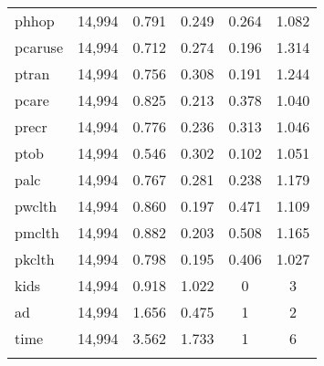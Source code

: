 \documentclass[]{article}
\begin{document}
\begin{table}[!htbp]
\begin{tabular}{@{\extracolsep{5pt}}lccccc}
phhop & 14,994 & 0.791 & 0.249 & 0.264 & 1.082 \\ 
pcaruse & 14,994 & 0.712 & 0.274 & 0.196 & 1.314 \\ 
ptran & 14,994 & 0.756 & 0.308 & 0.191 & 1.244 \\ 
pcare & 14,994 & 0.825 & 0.213 & 0.378 & 1.040 \\ 
precr & 14,994 & 0.776 & 0.236 & 0.313 & 1.046 \\ 
ptob & 14,994 & 0.546 & 0.302 & 0.102 & 1.051 \\ 
palc & 14,994 & 0.767 & 0.281 & 0.238 & 1.179 \\ 
pwclth & 14,994 & 0.860 & 0.197 & 0.471 & 1.109 \\ 
pmclth & 14,994 & 0.882 & 0.203 & 0.508 & 1.165 \\ 
pkclth & 14,994 & 0.798 & 0.195 & 0.406 & 1.027 \\ 
kids & 14,994 & 0.918 & 1.022 & 0 & 3 \\ 
ad & 14,994 & 1.656 & 0.475 & 1 & 2 \\ 
time & 14,994 & 3.562 & 1.733 & 1 & 6 \\ 
\hline \\[-1.8ex] 
\end{tabular} 
\end{table}
\end{document}
